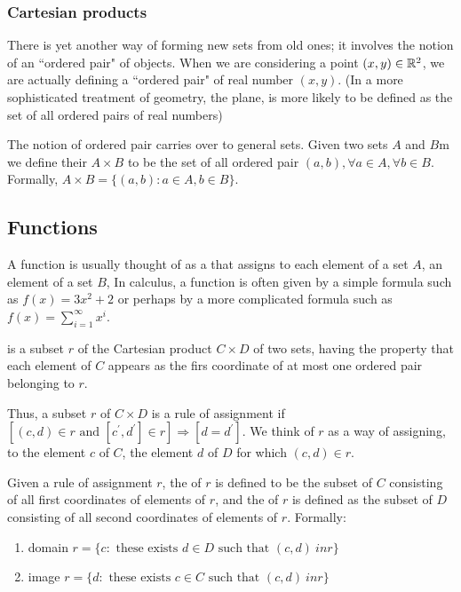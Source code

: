 \subsubsection{Cartesian products}\label{sec:cartesian_products}

There is yet another way of forming new sets from old ones; it involves the notion of an ``ordered pair" of objects. When we are considering a point $(x, y) \in \mathbb{R}^2$, we are actually defining a ``ordered pair" of real number $(x, y)$. (In a more sophisticated treatment of geometry, the plane, is more likely to be defined as the set of all ordered pairs of real numbers)

The notion of ordered pair carries over to general sets. Given two sets $A$ and $B$m we define their \textbf{} $A \times B$ to be the set of all ordered pair $(a, b), \forall a \in A, \forall b \in B$. Formally, $A \times B = \{(a, b): a \in A, b \in B\}$.


\subsection{Functions}\label{sec:functions}

A function is usually thought of as a  that assigns to each element of a set $A$, an element of a set $B$, In calculus, a function is often given by a simple formula such as $f(x) = 3x^2 + 2$ or perhaps by a more complicated formula such as $f(x) = \sum_{i=1}^{\infty}x^i$.

\begin{definition}
\textbf{} is a subset $r$ of the Cartesian product $C \times D$ of two sets, having the property that each element of $C$ appears as the firs coordinate of at most one ordered pair belonging to $r$.
\end{definition}

Thus, a subset $r$ of $C \times D$ is a rule of assignment if $[(c, d) \in r \text{ and } [c^{\prime}, d^{\prime}] \in r] \Rightarrow [d = d^{\prime}]$. We think of $r$ as a way of assigning, to the element $c$ of $C$, the element $d$ of $D$ for which $(c, d) \in r$.

Given a rule of assignment $r$, the \textbf{} of $r$ is defined to be the subset of $C$ consisting of all first coordinates of elements of $r$, and the \textbf{} of $r$ is defined as the subset of $D$ consisting of all second coordinates of elements of $r$. Formally:
\begin{enumerate}[itemsep=0pt]
    \item domain $r= \{c: \text{ these exists } d \in D \text{ such that } (c, d) \ in r\}$
    \item image $r = \{d: \text{ these exists } c \in C \text{ such that } (c, d) \ in r\}$
\end{enumerate}

